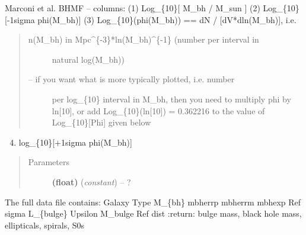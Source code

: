 \documentclass[letterpaper,10pt,english]{sphinxmanual}
\begin{document}
\begin{fulllineitems}
\label{SamPy.astronomy:SamPy.astronomy.blackholes.MarconiMassFunction}
Marconi et al. BHMF -- columns:
(1)  Log\_\{10\}{[} M\_bh / M\_sun {]}
(2)  Log\_\{10\}{[}-1sigma phi(M\_bh){]}
(3)  Log\_\{10\}(phi(M\_bh)) == dN / {[}dV*dln(M\_bh){]}, i.e.
\begin{quote}
\begin{description}
\item[{n(M\_bh) in Mpc\textasciicircum{}\{-3\}*ln(M\_bh)\textasciicircum{}\{-1\} (number per interval in}] \leavevmode
natural log(M\_bh))

\item[{-- if you want what is more typically plotted, i.e. number}] \leavevmode
per log\_\{10\} interval in M\_bh, then you need to multiply
phi by ln{[}10{]}, or add Log\_\{10\}(ln{[}10{]}) = 0.362216 to the value of
Log\_\{10\}{[}Phi{]} given below

\end{description}
\end{quote}
\begin{enumerate}
\setcounter{enumi}{3}
\item {} 
log\_\{10\}{[}+1sigma phi(M\_bh){]}

\end{enumerate}
\begin{quote}\begin{description}
\item[{Parameters}] \leavevmode
\textbf{(float)} (\emph{constant}) -- 
?


\end{description}\end{quote}

\end{fulllineitems}



\begin{fulllineitems}
\label{SamPy.astronomy:SamPy.astronomy.blackholes.MassesHaeringRix}
The full data file contains:
Galaxy Type M\_\{bh\} mbherrp mbherrm mbhexp Ref sigma
L\_\{bulge\} Upsilon M\_bulge Ref dist
:return: bulge mass, black hole mass, ellipticals, spirals, S0s

\end{fulllineitems}
\end{document}
